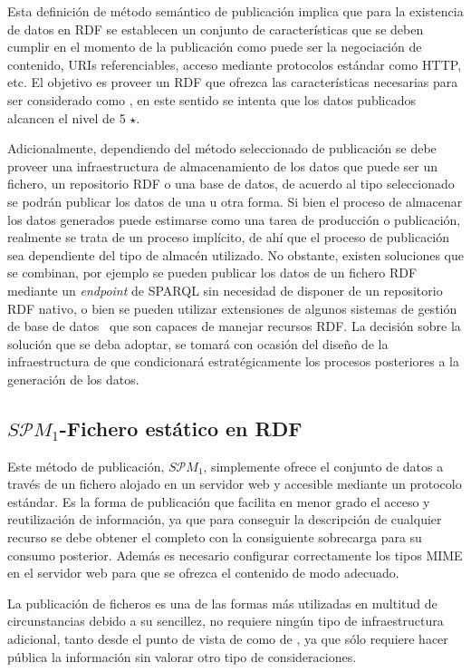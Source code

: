 Esta definición de método semántico de publicación implica que para la existencia de datos en \gls{RDF} 
se establecen un conjunto de características que se deben cumplir en el momento de la publicación como
puede ser la negociación de contenido, \gls{URI}s referenciables, acceso mediante protocolos estándar como \gls{HTTP}, etc. El objetivo es proveer
un \dataset RDF que ofrezca las características necesarias para ser considerado
como \linkeddata, en este sentido se intenta que los datos publicados alcancen el nivel de 5 $\star$.

Adicionalmente, dependiendo del método seleccionado de publicación se debe proveer una infraestructura
de almacenamiento de los datos que puede ser un fichero, un repositorio RDF o una base de datos, de acuerdo al 
tipo seleccionado se podrán publicar los datos de una u otra forma. Si bien el proceso de almacenar
los datos generados puede estimarse como una tarea de producción o publicación, realmente se trata
de un proceso implícito, de ahí que el proceso de publicación sea dependiente del tipo de almacén 
utilizado. No obstante, existen soluciones que se combinan, por ejemplo se pueden publicar los datos
de un fichero RDF mediante un \textit{endpoint} de \gls{SPARQL} sin necesidad de disponer de un repositorio
RDF nativo, o bien se pueden utilizar extensiones de algunos sistemas de gestión de base de datos~\cite{oracle-rdf} 
que son capaces de manejar recursos RDF. La decisión sobre la solución que se deba adoptar, se tomará con ocasión 
del diseño de la infraestructura de \linkeddata que condicionará estratégicamente los procesos posteriores a la generación de los datos.

\subsection{$S\mathcal{P}M_{1}$-Fichero estático en RDF}\label{spm-1-pub}
Este método de publicación, $S\mathcal{P}M_{1}$, simplemente ofrece el conjunto de datos
a través de un fichero alojado en un servidor web y accesible mediante un protocolo estándar.
Es la forma de publicación que facilita en menor grado el acceso y reutilización de información, 
ya que para conseguir la descripción de cualquier recurso se debe obtener el \dataset completo 
con la consiguiente sobrecarga para su consumo posterior. Además es necesario configurar correctamente los 
tipos \gls{MIME} en el servidor web para que se ofrezca el contenido de modo adecuado.

La publicación de ficheros es una de las formas más utilizadas en multitud de circunstancias debido a su
sencillez, no requiere ningún tipo de infraestructura adicional, tanto desde el punto de vista de \opendata como de \linkeddata, ya que sólo requiere
hacer pública la información sin valorar otro tipo de consideraciones.

